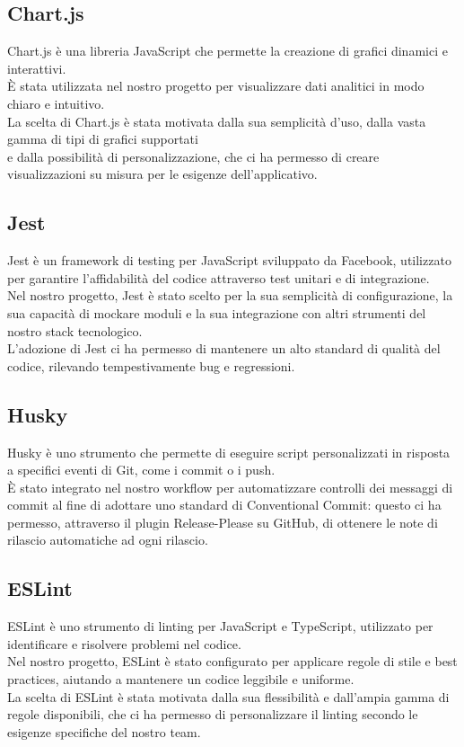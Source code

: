 \subsection{Chart.js}
Chart.js\cite{chartjs} è una libreria JavaScript che permette la creazione di grafici dinamici e interattivi.\\
È stata utilizzata nel nostro progetto per visualizzare dati analitici in modo chiaro e intuitivo.\\
La scelta di Chart.js è stata motivata dalla sua semplicità d'uso, dalla vasta gamma di tipi di grafici supportati\\
e dalla possibilità di personalizzazione, che ci ha permesso di creare visualizzazioni su misura per le esigenze dell'applicativo.

\subsection{Jest}
Jest\cite{jest} è un framework di testing per JavaScript sviluppato da Facebook, utilizzato per garantire l'affidabilità del
codice attraverso test unitari e di integrazione.\\
Nel nostro progetto, Jest è stato scelto per la sua semplicità di configurazione, la sua capacità
di mockare moduli e la sua integrazione con altri strumenti del nostro stack tecnologico.\\
L'adozione di Jest ci ha permesso di mantenere un alto standard di qualità del codice, rilevando tempestivamente bug e regressioni.

\subsection{Husky}
Husky\cite{husky} è uno strumento che permette di eseguire script personalizzati in risposta a specifici eventi di Git,
come i commit o i push.\\ È stato integrato nel nostro workflow per automatizzare controlli dei messaggi di commit
al fine di adottare uno standard di Conventional Commit: questo ci ha permesso, attraverso il plugin Release-Please su GitHub, di ottenere le note di rilascio automatiche ad ogni rilascio.

\subsection{ESLint}
ESLint\cite{eslint} è uno strumento di linting per JavaScript e TypeScript, utilizzato per identificare e risolvere problemi nel codice.\\
Nel nostro progetto, ESLint è stato configurato per applicare regole di stile e best practices, aiutando a mantenere un
codice leggibile e uniforme.\\ La scelta di ESLint è stata motivata dalla sua flessibilità e dall'ampia gamma di regole
disponibili, che ci ha permesso di personalizzare il linting secondo le esigenze specifiche del nostro team.
